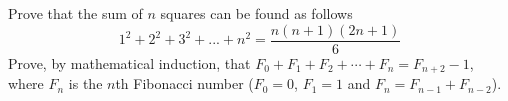 \begin{questions}
\question Prove that the sum of $n$ squares can be found as follows\[1^2 +2^2 +3^2+...+n^2 = \frac{n(n+1)(2n+1)}{6}\]
%
%
%
%
%
\question  Prove, by mathematical induction, that $F_0 + F_1 + F_2 + \cdots + F_{n} = F_{n+2} - 1$, where $F_n$ is the $n$th Fibonacci number ($F_0 = 0$, $F_1 = 1$ and $F_n = F_{n-1} + F_{n-2}$).

\end{questions}
